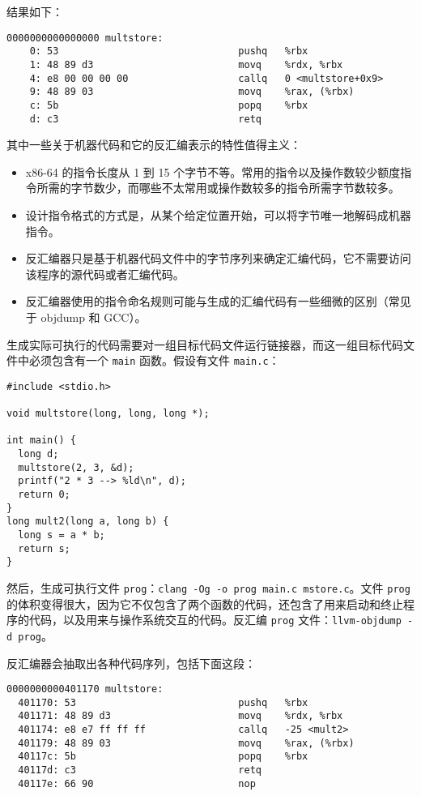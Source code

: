 结果如下：

\begin{verbatim}
0000000000000000 multstore:
    0: 53                               pushq   %rbx
    1: 48 89 d3                         movq    %rdx, %rbx
    4: e8 00 00 00 00                   callq   0 <multstore+0x9>
    9: 48 89 03                         movq    %rax, (%rbx)
    c: 5b                               popq    %rbx
    d: c3                               retq
\end{verbatim}

其中一些关于机器代码和它的反汇编表示的特性值得主义：

\begin{itemize}
    \item x86-64 的指令长度从 1 到 15 个字节不等。常用的指令以及操作数较少额度指令所需的字节数少，而哪些不太常用或操作数较多的指令所需字节数较多。
    \item 设计指令格式的方式是，从某个给定位置开始，可以将字节唯一地解码成机器指令。
    \item 反汇编器只是基于机器代码文件中的字节序列来确定汇编代码，它不需要访问该程序的源代码或者汇编代码。
    \item 反汇编器使用的指令命名规则可能与生成的汇编代码有一些细微的区别（常见于 objdump 和 GCC）。
\end{itemize}

生成实际可执行的代码需要对一组目标代码文件运行链接器，而这一组目标代码文件中必须包含有一个 \verb|main| 函数。假设有文件 \verb|main.c|：

\begin{verbatim}
#include <stdio.h>

void multstore(long, long, long *);

int main() {
  long d;
  multstore(2, 3, &d);
  printf("2 * 3 --> %ld\n", d);
  return 0;
}
long mult2(long a, long b) {
  long s = a * b;
  return s;
}
\end{verbatim}

然后，生成可执行文件 \verb|prog|：\verb|clang -Og -o prog main.c mstore.c|。文件 \verb|prog| 的体积变得很大，因为它不仅包含了两个函数的代码，还包含了用来启动和终止程序的代码，以及用来与操作系统交互的代码。反汇编 \verb|prog| 文件：\verb|llvm-objdump -d prog|。

反汇编器会抽取出各种代码序列，包括下面这段：

\begin{verbatim}
0000000000401170 multstore:
  401170: 53                            pushq   %rbx
  401171: 48 89 d3                      movq    %rdx, %rbx
  401174: e8 e7 ff ff ff                callq   -25 <mult2>
  401179: 48 89 03                      movq    %rax, (%rbx)
  40117c: 5b                            popq    %rbx
  40117d: c3                            retq
  40117e: 66 90                         nop
\end{verbatim}

